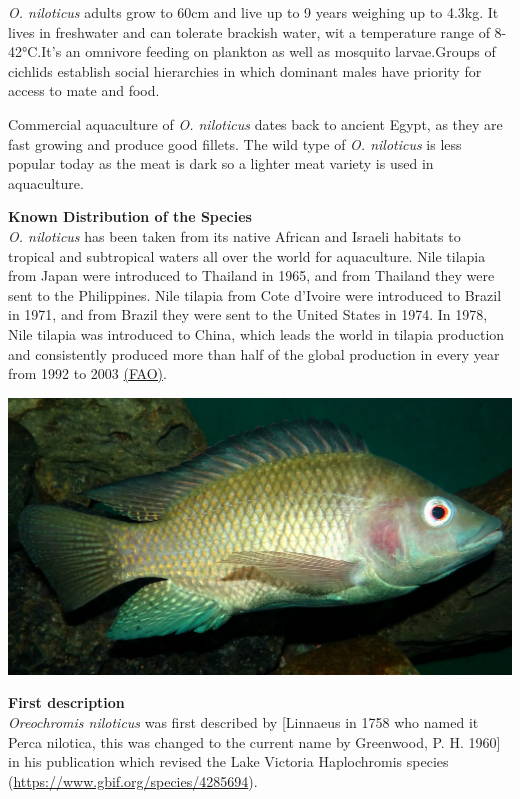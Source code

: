\documentclass[]{book}
\theoremstyle{definition}
\theoremstyle{definition}
\theoremstyle{definition}
\theoremstyle{remark}
\begin{document}
\emph{O. niloticus} adults grow to 60cm and live up to 9 years weighing
up to 4.3kg. It lives in freshwater and can tolerate brackish water, wit
a temperature range of 8-42°C.It's an omnivore feeding on plankton as
well as mosquito larvae.Groups of cichlids establish social hierarchies
in which dominant males have priority for access to mate and food.

Commercial aquaculture of \emph{O. niloticus} dates back to ancient
Egypt, as they are fast growing and produce good fillets. The wild type
of \emph{O. niloticus} is less popular today as the meat is dark so a
lighter meat variety is used in aquaculture.

\textbf{Known Distribution of the Species}\\
\emph{O. niloticus} has been taken from its native African and Israeli
habitats to tropical and subtropical waters all over the world for
aquaculture. Nile tilapia from Japan were introduced to Thailand in
1965, and from Thailand they were sent to the Philippines. Nile tilapia
from Cote d'Ivoire were introduced to Brazil in 1971, and from Brazil
they were sent to the United States in 1974. In 1978, Nile tilapia was
introduced to China, which leads the world in tilapia production and
consistently produced more than half of the global production in every
year from 1992 to 2003
\href{http://www.fao.org/fishery/culturedspecies/Oreochromis_niloticus/en}{(FAO)}.

\includegraphics{images_species/Oreochromis-niloticus-Nairobi.jpg}

\textbf{First description}\\
\emph{Oreochromis niloticus} was first described by {[}Linnaeus in 1758
who named it Perca nilotica, this was changed to the current name by
Greenwood, P. H. 1960{]} in his publication which revised the Lake
Victoria Haplochromis species
(\url{https://www.gbif.org/species/4285694}).
\end{document}
